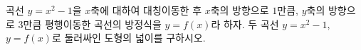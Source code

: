 곡선 $y=x^2-1$을 $x$축에 대하여 대칭이동한 후 $x$축의 방향으로 $1$만큼, $y$축의 방향으로 $3$만큼 평행이동한 곡선의 방정식을 $y=f(x)$라 하자. 두 곡선 $y=x^2-1$, $y=f(x)$로 둘러싸인 도형의 넓이를 구하시오.
